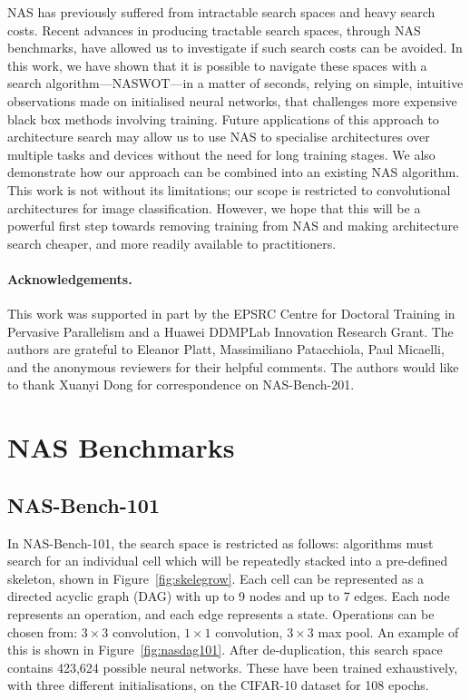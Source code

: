 \documentclass{article}
\begin{document}
NAS has previously suffered from intractable search spaces and heavy search costs. Recent advances in producing tractable search spaces, through NAS benchmarks, have allowed us to investigate if such search costs can be avoided. In this work, we have shown that it is possible to navigate these spaces with a search algorithm---NASWOT---in a matter of seconds, relying on simple, intuitive observations made on initialised neural networks, that challenges more expensive black box methods involving training. Future applications of this approach to architecture search may allow us to use NAS to specialise architectures over multiple tasks and devices without the need for long training stages.
We also demonstrate how our approach can be combined into an existing NAS algorithm. This work is not without its limitations; our scope is restricted to convolutional architectures for image classification. However, we hope that this will be a powerful first step towards removing training from NAS and making architecture search cheaper, and more readily available to practitioners.


\vspace{-2mm}
\paragraph{Acknowledgements.} { This work was supported in part by the EPSRC Centre for Doctoral Training in Pervasive Parallelism and a Huawei DDMPLab Innovation Research Grant. The authors are grateful to Eleanor Platt, Massimiliano Patacchiola, Paul Micaelli, and the anonymous reviewers for their helpful comments. The authors would like to thank Xuanyi Dong for correspondence on NAS-Bench-201.}






\clearpage 
\appendix




\section{NAS Benchmarks}
\label{appendix:nasbench}


\subsection{NAS-Bench-101}
In NAS-Bench-101, the search space is restricted as follows: algorithms must search for an individual cell which will be repeatedly stacked into a pre-defined skeleton, shown in Figure~\ref{fig:skelegrow}. Each cell can be represented as a directed acyclic graph (DAG) with up to 9 nodes and up to 7 edges. Each node represents an operation, and each edge represents a state. Operations can be chosen from: $3\times 3$ convolution, $1\times 1$ convolution, $3\times 3$ max pool. An example of this is shown in Figure~\ref{fig:nasdag101}. After de-duplication, this search space contains 423,624 possible neural networks. These have been trained exhaustively, with three different initialisations, on the CIFAR-10 dataset for 108 epochs. 
\end{document}
